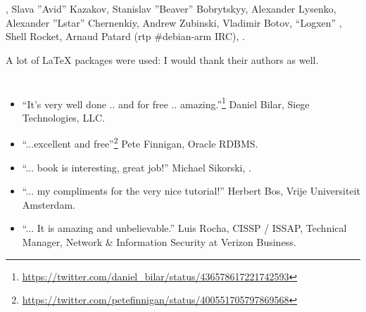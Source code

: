 \HERMIT, 
{Slava ''Avid'' Kazakov, Stanislav ''Beaver'' Bobrytskyy, Alexander Lysenko, 
Alexander ''Lstar'' Chernenkiy, Andrew Zubinski, Vladimir Botov},  ``Logxen'' ,
Shell Rocket, Arnaud Patard (rtp  \#debian-arm IRC), 
.

{A lot of \LaTeX{} packages were used: I would thank their authors as well}.

\section{}

\begin{itemize}
\item ``It's very well done .. and for free .. amazing.''\footnote{\url{https://twitter.com/daniel_bilar/status/436578617221742593}} Daniel Bilar, Siege Technologies, LLC.

\item ``...excellent and free''\footnote{\url{https://twitter.com/petefinnigan/status/400551705797869568}} Pete Finnigan, Oracle RDBMS.

\item ``... book is interesting, great job!'' Michael Sikorski,  .

\item ``... my compliments for the very nice tutorial!'' Herbert Bos,  Vrije Universiteit Amsterdam.

\item ``... It is amazing and unbelievable.'' Luis Rocha, CISSP / ISSAP, Technical Manager, Network \& Information Security at Verizon Business.
\end{itemize}




